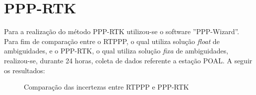 \section{PPP-RTK}
Para a realização do método PPP-RTK utilizou-se o software ''PPP-Wizard''. Para fim de comparação entre o RTPPP, o qual utiliza solução \textit{float} de ambiguidades, e o PPP-RTK, o qual utiliza solução \textit{fixa} de ambiguidades, realizou-se, durante 24 horas, coleta de dados referente a estação POAL. A seguir os resultados:

\begin{figure}[H]
\centering
{}
\caption{Comparação das incertezas entre RTPPP e PPP-RTK}
\label{comparacao_incert}
\end{figure}

